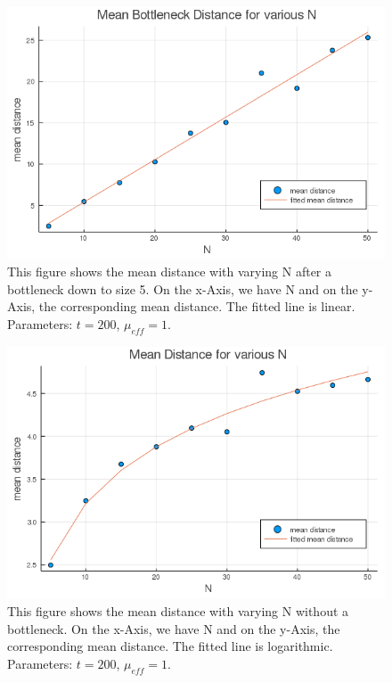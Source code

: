 \documentclass{article}
\numberwithin{equation}{subsection}
\begin{document}
	\begin{figure}[h!]
		\centering
		\includegraphics[width=\linewidth]{phyldistvarNbn_t200.png}
		
		\caption{This figure shows the mean distance with varying N after a bottleneck down to size 5. On the x-Axis, we have N and on the y-Axis, the corresponding mean distance. The fitted line is linear. Parameters: $ t = 200$, $\mu_{eff} = 1 $.}
		\label{fig::NbnDistmean}
	\end{figure}

	\begin{figure}[h!]
	\centering
	\includegraphics[width=\linewidth]{phyldistvarN_t200.png}
	
	\caption{This figure shows the mean distance with varying N without a bottleneck. On the x-Axis, we have N and on the y-Axis, the corresponding mean distance. The fitted line is logarithmic. Parameters: $ t = 200$, $\mu_{eff} = 1 $.}
	\label{fig::NDistmean}
\end{figure}
\end{document}
